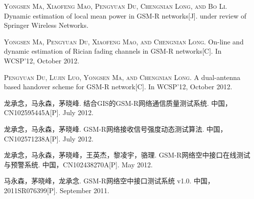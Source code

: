 
\begin{publications}{99}

    \item\textsc{Yongsen Ma, Xiaofeng Mao, Pengyuan Du, Chengnian Long, and Bo Li}. {Dynamic estimation of local mean power in GSM-R networks}[J]. under review of Springer Wireless Networks.


    \item\textsc{Yongsen Ma, Pengyuan Du, Xiaofeng Mao, and Chengnian Long}. {On-line and dynamic estimation of Rician fading channels in GSM-R networks}[C]. In WCSP’12, October 2012.

    \item\textsc{Pengyuan Du, Lujin Luo, Yongsen Ma, and Chengnian Long}. {A dual-antenna based handover scheme for GSM-R network}[C]. In WCSP’12, October 2012.

    \item\textsc{龙承念，马永森，茅晓峰}. {结合GIS的GSM-R网络通信质量测试系统}. {中国，CN102595445A}[P]. July 2012.

    \item\textsc{龙承念，马永森，茅晓峰}. {GSM-R网络接收信号强度动态测试算法}. {中国，CN102571238A}[P]. July 2012.

    \item\textsc{龙承念，马永森，茅晓峰，王英杰，黎凌宇，骆理}. {GSM-R网络空中接口在线测试与预警系统}. {中国，CN102438270A}[P]. May 2012.

    \item\textsc{马永森，茅晓峰，龙承念}. {GSM-R网络空中接口测试系统 v1.0}. {中国，2011SR076399}[P]. September 2011.
\end{publications}
